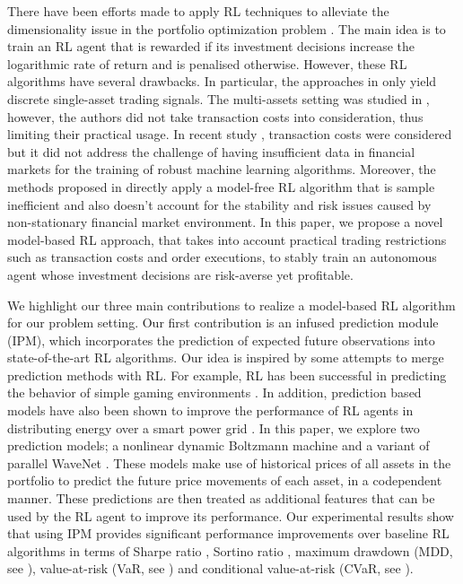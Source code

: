 \documentclass{article}
\begin{document}
There have been efforts made to apply RL techniques to alleviate the dimensionality issue in the portfolio optimization problem \cite{moody2001learning, dempster2006automated, cumming2015investigation, jiang2017deep, deng2017deep, guo2018robust, liang2018adversarial}. The main idea is to train an RL agent that is rewarded if its investment decisions increase the logarithmic rate of return and is penalised otherwise. However, these RL algorithms have several drawbacks. In particular, the approaches in \cite{moody2001learning, dempster2006automated, cumming2015investigation, deng2017deep} only yield discrete single-asset trading signals. The multi-assets setting was studied in \cite{guo2018robust}, {however, the authors did not take transaction costs into consideration, thus limiting their practical usage}. In {recent study} \cite{jiang2017deep,liang2018adversarial}, transaction costs were considered but it did not address the challenge of having insufficient data in {financial markets} for the training of robust machine learning algorithms. {Moreover, the methods proposed in \cite{jiang2017deep,liang2018adversarial} directly apply a model-free RL algorithm that is sample inefficient and also doesn't account for the stability and risk issues caused by non-stationary financial market environment}.  In this paper, we propose a {novel model-based} RL approach, that takes into account practical trading restrictions such as transaction costs and order executions, to stably train an autonomous agent whose investment decisions are risk-averse yet profitable.  

{We highlight our three main contributions to realize a model-based RL algorithm for our problem setting}. Our first contribution is an infused prediction module (IPM), which incorporates the {prediction of expected future observations} into state-of-the-art RL algorithms. Our idea is inspired by some attempts to merge prediction methods with RL. {For example, RL has been successful in predicting the behavior of simple gaming environments} \cite{oh2015action}. In addition, {prediction based models have also been shown to improve the performance of RL agents} in distributing energy over a smart power grid \cite{marinescu2017prediction}. {In this paper}, we explore two prediction models; a nonlinear dynamic Boltzmann machine \cite{dasgupta2017nonlinear} and a variant of parallel WaveNet \cite{pmlr-v80-oord18a}. These models make use of historical prices of all assets in the portfolio to predict the future price movements of each asset, in a codependent manner. These predictions are then treated as additional features that can be used by the RL agent to improve its performance. Our experimental results show that using IPM provides significant performance improvements over baseline RL algorithms in terms of Sharpe ratio \cite{sharpe1966mutual}, Sortino ratio \cite{sortino1994performance}, maximum drawdown (MDD, see \cite{chekhlov2005drawdown}), value-at-risk (VaR, see \cite{artzner1999coherent}) and conditional value-at-risk (CVaR, see \cite{rockafellar2000optimization}). 
\end{document}
